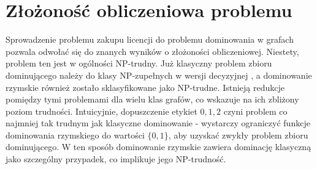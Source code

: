 \section{Złożoność obliczeniowa problemu}


Sprowadzenie problemu zakupu licencji do problemu dominowania w grafach pozwala odwołać się do znanych wyników o złożoności obliczeniowej. Niestety, problem ten jest w ogólności NP-trudny. Już klasyczny problem zbioru dominującego należy do klasy NP-zupełnych w wersji decyzyjnej \cite{booth1980dominating}, a dominowanie rzymskie również zostało sklasyfikowane jako NP-trudne. Istnieją redukcje pomiędzy tymi problemami dla wielu klas grafów, co wskazuje na ich zbliżony poziom trudności. Intuicyjnie, dopuszczenie etykiet $0,1,2$ czyni problem co najmniej tak trudnym jak klasyczne dominowanie - wystarczy ograniczyć funkcje dominowania rzymskiego do wartości $\{0,1\}$, aby uzyskać zwykły problem zbioru dominującego. W ten sposób dominowanie rzymskie zawiera dominację klasyczną jako szczególny przypadek, co implikuje jego NP-trudność.

